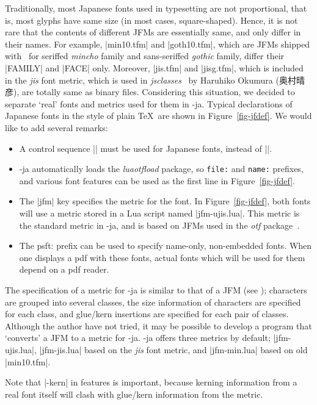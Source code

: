 \documentclass{ajt}
\begin{document}
Traditionally, most Japanese fonts used in typesetting are not
proportional, that is, most glyphs have same size (in most cases,
square-shaped). Hence, it is not rare that the contents of different
JFMs are essentially same, and only differ in their names. For example,
|min10.tfm| and |goth10.tfm|, which are JFMs shipped with \pTeX\ for
seriffed \emph{mincho} family and sans-seriffed \emph{gothic} family,
differ their |FAMILY| and |FACE| only. Moreover, |jis.tfm| and
|jisg.tfm|, which is included in the \emph{jis} font metric, which is
used in \emph{jsclasses}~\cite{jsclasses} by Haruhiko Okumura (奥村晴彦),
are totally same as binary files.  Considering this situation, we
decided to separate `real' fonts and metrics used for them in
\LuaTeX-ja. Typical declarations of Japanese fonts in the style of plain
\TeX\ are shown in Figure~\ref{fig-jfdef}. We would like to add several
remarks:
\begin{itemize}
\item A control sequence |\jfont| must be used for Japanese fonts, instead of |\font|.
\item \LuaTeX-ja automatically loads the \emph{luaotfload} package, so
      \hbox{\tt file:} and \hbox{\tt name:} prefixes, and various font features can be
      used as the first line in Figure~\ref{fig-jfdef}.
\item The |jfm| key specifies the metric for the font. In
      Figure~\ref{fig-jfdef}, both fonts will use a metric stored in a
      Lua script named |jfm-ujis.lua|. This metric is the standard
      metric in \LuaTeX-ja, and is based on JFMs used in the \emph{otf}
      package~\cite{otf}.
\item The \hbox{psft:} prefix can be used to specify name-only, non-embedded
      fonts. When one displays a pdf with these fonts, actual fonts which
      will be used for them depend on a pdf reader. 
\end{itemize}
The specification of a metric for \LuaTeX-ja is similar to that of a JFM
(see \cite{ptexjp}); characters are grouped into several classes, the
size information of characters are specified for each class, and
glue/kern insertions are specified for each pair of classes. Although
the author have not tried, it may be possible to develop a program that
`converts' a JFM to a metric for \LuaTeX-ja.  \LuaTeX-ja offers three
metrics by default; |jfm-ujis.lua|, |jfm-jis.lua| based on the
\emph{jis} font metric, and |jfm-min.lua| based on old |min10.tfm|.

 Note that |-kern| in features
is important, because kerning information from a real font itself will
clash with glue/kern information from the metric.
\end{document}
